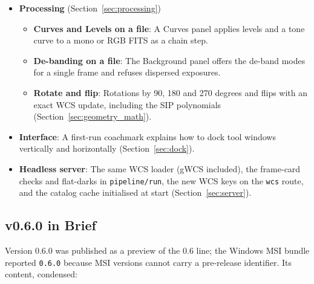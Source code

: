 \documentclass[11pt,a4paper]{article}
\newcommand{\code}[1]{\texttt{\small #1}}
\begin{document}
\begin{itemize}[nosep]
\begin{itemize}[nosep]
        \item \textbf{Run tokens, crop and export}: Wizard cache keys carry a per-run token so a late Align cannot overwrite a newer one; a stack that finishes after a Reset is discarded; Crop works on a single channel; star removal no longer marks Stretch done; Export shows and records the fixed channel mapping.
        \end{itemize}
    \item \textbf{Processing} (Section~\ref{sec:processing})
        \begin{itemize}[nosep]
        \item \textbf{Curves and Levels on a file}: A Curves panel applies levels and a tone curve to a mono or RGB FITS as a chain step.
        \item \textbf{De-banding on a file}: The Background panel offers the de-band modes for a single frame and refuses dispersed exposures.
        \item \textbf{Rotate and flip}: Rotations by 90, 180 and 270 degrees and flips with an exact WCS update, including the SIP polynomials (Section~\ref{sec:geometry_math}).
        \end{itemize}
    \item \textbf{Interface}: A first-run coachmark explains how to dock tool windows vertically and horizontally (Section~\ref{sec:dock}).
    \item \textbf{Headless server}: The same WCS loader (gWCS included), the frame-card checks and flat-darks in \code{pipeline/run}, the new WCS keys on the \code{wcs} route, and the catalog cache initialised at start (Section~\ref{sec:server}).
    \end{itemize}

    \subsection{v0.6.0 in Brief}

    Version 0.6.0 was published as a preview of the 0.6 line; the Windows MSI bundle reported \code{0.6.0} because MSI versions cannot carry a pre-release identifier. Its content, condensed:
\end{document}
